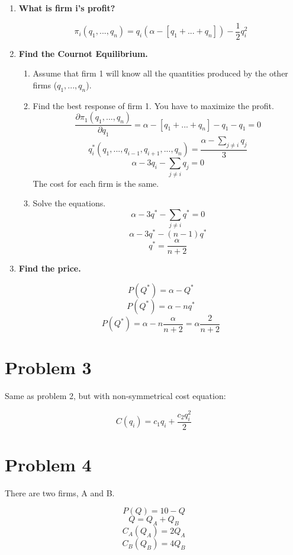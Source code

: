 \documentclass{article}
\begin{document}
\begin{enumerate}
    \item \textbf{What is firm i's profit?}
    
    $$\pi_{i}(q_{1},...,q_{n})=q_{i}(\alpha-[q_{1}+...+q_{n}])-\frac{1}{2}q_{i}^{2}$$
    
    \item \textbf{Find the Cournot Equilibrium.}
    
    \begin{enumerate}[i]
        \item Assume that firm 1 will know all the quantities produced by the
                other firms ($q_{1},...,q_{n}$).

        \item Find the best response of firm 1. You have to maximize the profit.
        $$\frac{\partial \pi_{1}(q_{1},...,q_{n})}{\partial
        q_{1}}=\alpha-[q_{1}+...+q_{n}]-q_{1}-q_{1}=0$$
        $$q_{i}^{*}(q_{1},...,q_{i-1},q_{i+1},...,q_{n})=\frac{\alpha-\sum_{j\neq
        i} q_{j}}{3}$$
        $$\alpha-3q_{i}-\sum_{j\neq i}q_{j}=0$$
        The cost for each firm is the same.
        \item Solve the equations.
        $$\alpha - 3q^{*}-\sum_{j\neq i}q^{*}=0$$
        $$\alpha - 3q^{*}-(n-1)q^{*}$$
        $$q^{*}=\frac{\alpha}{n+2}$$
    \end{enumerate}
    
    \item \textbf{Find the price.}
    
    $$P(Q^{*})=\alpha-Q^{*}$$
    $$P(Q^{*})=\alpha-n q^{*}$$
    $$P(Q^{*})=\alpha-n \frac{\alpha}{n+2}=\alpha\frac{2}{n+2}$$
    
\end{enumerate}

\section*{Problem 3}

Same as problem 2, but with non-symmetrical cost equation:

$$C(q_{i})=c_{1}q_{i}+\frac{c_{2}q_{i}^{2}}{2}$$

\section*{Problem 4}

There are two firms, A and B.

$$P(Q)=10-Q$$
$$Q=Q_{A}+Q_{B}$$
$$C_{A}(Q_{A})=2Q_{A}$$
$$C_{B}(Q_{B})=4Q_{B}$$
\end{document}

